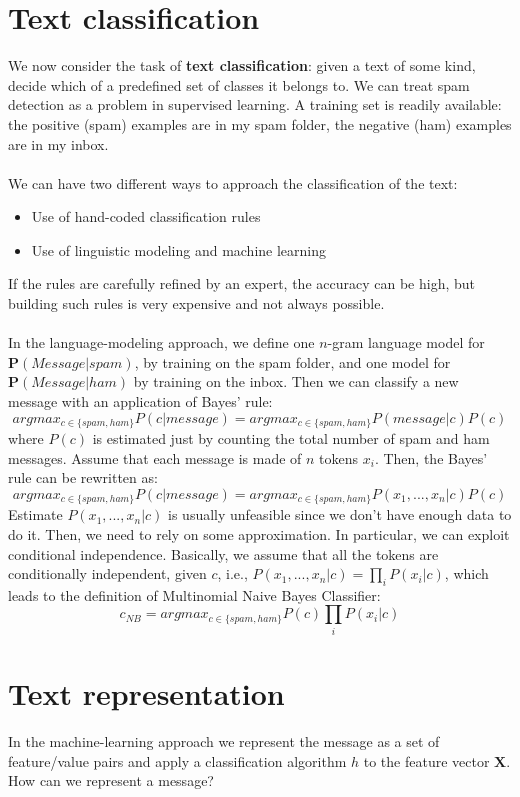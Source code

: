 \section{Text classification}
We now consider the task of \textbf{text classification}: given a text of some kind, decide which of a predefined set of classes it belongs to. We can treat spam detection as a problem in supervised learning. A training set is readily available: the positive (spam) examples are in my spam folder, the negative (ham) examples are in my inbox.\\\\
We can have two different ways to approach the classification of the text:
\begin{itemize}
    \item Use of hand-coded classification rules
    \item Use of linguistic modeling and machine learning
\end{itemize}
If the rules are carefully refined by an expert, the accuracy can be high, but building such rules is very expensive and not always possible.\\\\
In the language-modeling approach, we define one $n$-gram language model for $\textbf{P}(Message | spam)$, by training on the spam folder, and one model for $\textbf{P}(Message | ham)$ by training on the inbox. Then we can classify a new message with an application of Bayes’ rule:
\[argmax_{c \in \{spam, ham\}} P(c|message) = argmax_{c \in \{spam, ham\}} P(message|c)P(c)\]
where $P(c)$ is estimated just by counting the total number of spam and ham messages. Assume that each message is made of $n$ tokens $x_i$. Then, the Bayes' rule can be rewritten as:
\[argmax_{c \in \{spam, ham\}} P(c|message) = argmax_{c \in \{spam, ham\}} P(x_1, ..., x_n|c)P(c)\]
Estimate $P(x_1, ..., x_n|c)$ is usually unfeasible since we don't have enough data to do it. Then, we need to rely on some approximation. In particular, we can exploit conditional independence. Basically, we assume that all the tokens are conditionally independent, given $c$, i.e., $P(x_1, ..., x_n|c) = \prod_i P(x_i|c)$, which leads to the definition of Multinomial Naive Bayes Classifier:
\[c_{NB} = argmax_{c \in \{spam, ham\}} P(c)\prod_i P(x_i|c)\]

\section{Text representation}
In the machine-learning approach we represent the message as a set of feature/value
pairs and apply a classification algorithm $h$ to the feature vector $\textbf{X}$. How can we represent a message?

